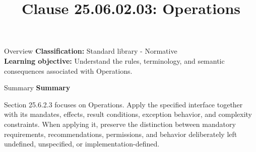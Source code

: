 \documentclass[10pt,letterpaper]{article}
\title{Clause 25.06.02.03: Operations}
\author{}
\date{}
\begin{document}
\maketitle
\begin{CornellOverviewBox}{Overview}
\textbf{Classification:} Standard library - Normative\\[2pt]
\textbf{Learning objective:} Understand the rules, terminology, and semantic consequences associated with Operations.
\end{CornellOverviewBox}\begin{CornellSummaryBox}{Summary}
{\sffamily\bfseries\color{Accent} Summary}\par\vspace{3pt}Section 25.6.2.3 focuses on Operations. Apply the specified interface together with its mandates, effects, result conditions, exception behavior, and complexity constraints. When applying it, preserve the distinction between mandatory requirements, recommendations, permissions, and behavior deliberately left undefined, unspecified, or implementation-defined.
\end{CornellSummaryBox}
\end{document}
